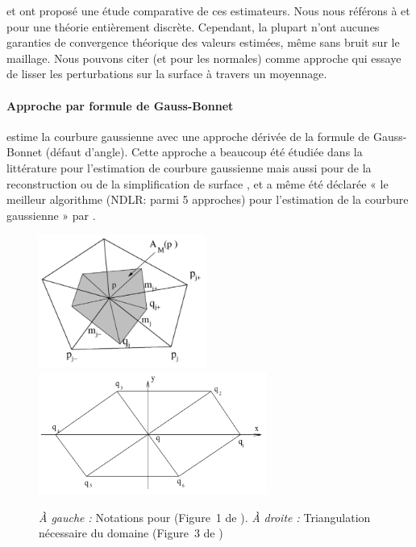 %
 et  ont
proposé une étude comparative de ces estimateurs. Nous nous
référons à  et 
pour une théorie entièrement discrète. Cependant, la plupart n'ont aucunes
garanties de convergence théorique des valeurs estimées, même sans bruit sur le
maillage. Nous pouvons citer \cite{Rusinkiewicz2004} (et \cite{Page2002} pour les normales) comme
approche qui essaye de lisser les perturbations sur la surface à travers un
moyennage.
%
\paragraph{Approche par formule de Gauss-Bonnet}
%
 estime la courbure gaussienne avec une approche dérivée de
la formule de Gauss-Bonnet (défaut d'angle). Cette approche a beaucoup été
étudiée dans la littérature pour l'estimation de courbure gaussienne
\cite{Meek2000, Stokely1992} mais aussi pour de la reconstruction \cite{Dyn2001}
ou de la simplification de surface \cite{Kim2002}, et a même été déclarée « le
meilleur algorithme (NDLR: parmi 5 approches) pour l'estimation de la courbure
gaussienne » par .

\begin{figure}[ht]
    \begin{center}
      \includegraphics[width=5.5cm]{images/Curvature/Notations_Xu}
      \includegraphics[width=7.5cm]{images/Curvature/Notations_Xu_2}
    \end{center}
    \caption[Notations pour .]{\emph{À gauche :} Notations pour  (Figure~1 de \cite{Xu2006}). \emph{À droite :} Triangulation nécessaire du domaine (Figure~3 de \cite{Xu2006})}
    \label{fig:xu_notations}
\end{figure}

